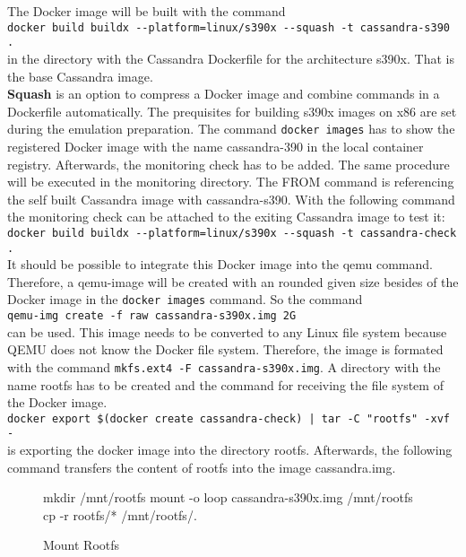 The Docker image will be built with the command  \\
\lstinline!docker build buildx --platform=linux/s390x --squash -t cassandra-s390 .! \\
in the directory with the Cassandra Dockerfile  for the architecture s390x. That is the base Cassandra image.\\
\textbf{Squash} is an option to compress a Docker image and combine commands in a Dockerfile automatically. The prequisites for building s390x images on x86 are set during the emulation preparation. The command \lstinline!docker images! has to show the registered Docker image with the name cassandra-390 in the local container registry. Afterwards, the monitoring check has to be added. 
The same procedure will be executed in the monitoring directory. The FROM command is referencing the self built Cassandra image with cassandra-s390. With the following command the monitoring check can be attached to the exiting Cassandra image to test it: \\
\lstinline!docker build buildx --platform=linux/s390x --squash -t cassandra-check .! \\
It should be possible to integrate this Docker image into the qemu command. Therefore, a qemu-image will be created with an rounded given size besides of the Docker image in the  \lstinline!docker images! command. So the command \\  
\lstinline!qemu-img create -f raw cassandra-s390x.img 2G!  \\
can be used. This image needs to be converted to any Linux file system because QEMU does not know the Docker file system. Therefore, the image is formated with the command  \lstinline!mkfs.ext4 -F cassandra-s390x.img!. A directory with the name rootfs has to be created and the command for receiving the file system of the Docker image. \\
\lstinline!docker export $(docker create cassandra-check) | tar -C "rootfs" -xvf -!  \\ 
is exporting the docker image into the directory rootfs. Afterwards, the following command transfers the content of rootfs into the image cassandra.img.

\begin{figure}[H]
\centering
\begin{boxedverbatim}
mkdir /mnt/rootfs
mount -o loop cassandra-s390x.img /mnt/rootfs
cp -r rootfs/* /mnt/rootfs/.
\end{boxedverbatim}
 \caption{Mount Rootfs}
    \label{Mount-Rootfs}
\end{figure}

